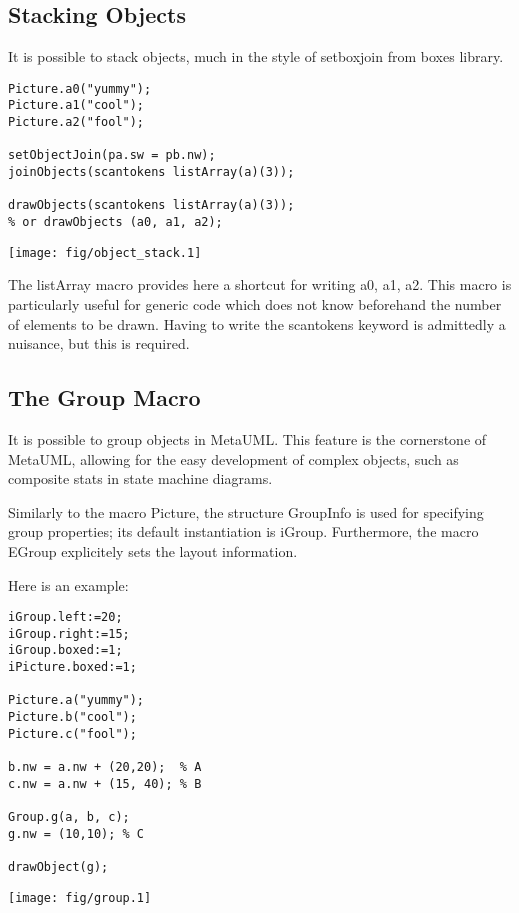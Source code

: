 \documentclass{article}
\newcommand{\code}{\ttfamily}
\newcommand{\metauml}{MetaUML}
\begin{document}
\subsection{Stacking Objects}

It is possible to stack objects, much in the style of {\code setboxjoin}
from {\code boxes} library.

\pagebreak

\begin{multicols}{2}
\begin{verbatim}
Picture.a0("yummy");
Picture.a1("cool");
Picture.a2("fool");

setObjectJoin(pa.sw = pb.nw);
joinObjects(scantokens listArray(a)(3));

drawObjects(scantokens listArray(a)(3));
% or drawObjects (a0, a1, a2);
\end{verbatim}
\columnbreak
\hspace{1cm}\texttt{[image: fig/object\_stack.1]}
\end{multicols}

The {\code listArray} macro provides here a shortcut for writing
{\code a0, a1, a2}. This macro is particularly useful for generic
code which does not know beforehand the number of elements to be drawn.
Having to write the {\code scantokens} keyword is admittedly a nuisance, but
this is required.


\subsection{The Group Macro}

It is possible to group objects in \metauml. This feature is the cornerstone
of \metauml, allowing for the easy development of complex objects, such as
composite stats in state machine diagrams.

Similarly to the macro {\code Picture}, the structure {\code GroupInfo}
is used for specifying group properties; its default instantiation is
{\code iGroup}. Furthermore, the macro {\code EGroup} explicitely sets the
layout information.

Here is an example:

\begin{multicols}{2}
\begin{verbatim}
iGroup.left:=20;
iGroup.right:=15;
iGroup.boxed:=1;
iPicture.boxed:=1;

Picture.a("yummy");
Picture.b("cool");
Picture.c("fool");

b.nw = a.nw + (20,20);  % A
c.nw = a.nw + (15, 40); % B

Group.g(a, b, c);
g.nw = (10,10); % C

drawObject(g);
\end{verbatim}
\columnbreak
\hspace{1cm}\texttt{[image: fig/group.1]}
\end{multicols}
\end{document}
